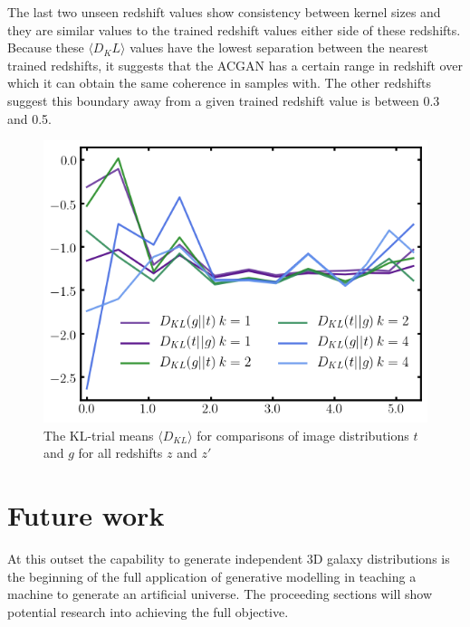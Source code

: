 \documentclass[twocolumn]{article}
\numberwithin{equation}{section}
\begin{document}
The last two unseen redshift values show consistency between kernel sizes and they are similar values to the trained redshift 
values either side of these redshifts. Because these $\langle D_KL \rangle$ values have the lowest separation between the 
nearest trained redshifts, it suggests that the ACGAN has a certain range in redshift over which it can obtain the same coherence 
in samples with. The other redshifts suggest this boundary away from a given trained redshift value is between 0.3 and 0.5.


\begin{figure}[!ht]%
\includegraphics[width=\columnwidth]{figures/graphs/z_kl1.png}
\centering
\caption{The KL-trial means $\langle D_{KL} \rangle$ for comparisons of image distributions 
         $t$ and $g$ for all redshifts $z$ and $z'$ }
\label{fig:z_kl}
\end{figure}




\section{Future work}\label{sec:future_work}
At this outset the capability to generate independent 3D galaxy distributions is the beginning of the full application of 
generative modelling in teaching a machine to generate an artificial universe. The proceeding sections will show potential 
research into achieving the full objective.
\end{document}
